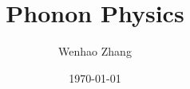 \documentclass{article}
\begin{document}
\title{Phonon Physics}
\author{Wenhao Zhang}
\date{\today}
\maketitle

\tableofcontents
\newpage







\begin{appendices}







\end{appendices}
\end{document}
